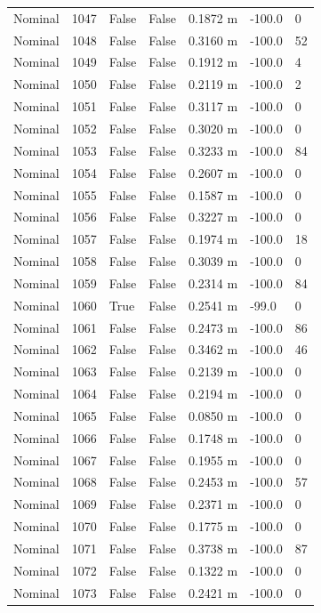 \documentclass[11pt,a4paper,oneside]{book}
\begin{document}
\begin{longtable}{l l l l l l l}
Nominal & 1047 & False & False & 0.1872 m & -100.0 & 0 \\
Nominal & 1048 & False & False & 0.3160 m & -100.0 & 52 \\
Nominal & 1049 & False & False & 0.1912 m & -100.0 & 4 \\
Nominal & 1050 & False & False & 0.2119 m & -100.0 & 2 \\
Nominal & 1051 & False & False & 0.3117 m & -100.0 & 0 \\
Nominal & 1052 & False & False & 0.3020 m & -100.0 & 0 \\
Nominal & 1053 & False & False & 0.3233 m & -100.0 & 84 \\
Nominal & 1054 & False & False & 0.2607 m & -100.0 & 0 \\
Nominal & 1055 & False & False & 0.1587 m & -100.0 & 0 \\
Nominal & 1056 & False & False & 0.3227 m & -100.0 & 0 \\
Nominal & 1057 & False & False & 0.1974 m & -100.0 & 18 \\
Nominal & 1058 & False & False & 0.3039 m & -100.0 & 0 \\
Nominal & 1059 & False & False & 0.2314 m & -100.0 & 84 \\
Nominal & 1060 & True & False & 0.2541 m & -99.0 & 0 \\
Nominal & 1061 & False & False & 0.2473 m & -100.0 & 86 \\
Nominal & 1062 & False & False & 0.3462 m & -100.0 & 46 \\
Nominal & 1063 & False & False & 0.2139 m & -100.0 & 0 \\
Nominal & 1064 & False & False & 0.2194 m & -100.0 & 0 \\
Nominal & 1065 & False & False & 0.0850 m & -100.0 & 0 \\
Nominal & 1066 & False & False & 0.1748 m & -100.0 & 0 \\
Nominal & 1067 & False & False & 0.1955 m & -100.0 & 0 \\
Nominal & 1068 & False & False & 0.2453 m & -100.0 & 57 \\
Nominal & 1069 & False & False & 0.2371 m & -100.0 & 0 \\
Nominal & 1070 & False & False & 0.1775 m & -100.0 & 0 \\
Nominal & 1071 & False & False & 0.3738 m & -100.0 & 87 \\
Nominal & 1072 & False & False & 0.1322 m & -100.0 & 0 \\
Nominal & 1073 & False & False & 0.2421 m & -100.0 & 0 \\

\end{longtable}
\end{document}
